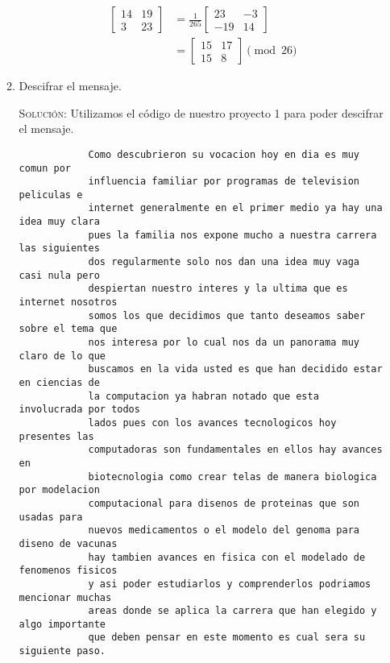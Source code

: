 \documentclass[letterpaper,10pt]{article}
\begin{document}
\begin{enumerate}
\begin{enumerate}
        \begin{align*}
            \begin{bmatrix} 14 & 19 \\ 3 & 23\end{bmatrix} 
            &= \frac{1}{265} \begin{bmatrix} 23 & -3 \\ -19 & 14\end{bmatrix} \\
            &= \begin{bmatrix} 15 & 17 \\ 15 & 8 \end{bmatrix} \pmod{26}
        \end{align*}
        
        \item Descifrar el mensaje.
        
        \textsc{Solución:} Utilizamos el código de nuestro proyecto 1 para
        poder descifrar el mensaje. 
        \begin{verbatim}
            Como descubrieron su vocacion hoy en dia es muy comun por
            influencia familiar por programas de television peliculas e 
            internet generalmente en el primer medio ya hay una idea muy clara 
            pues la familia nos expone mucho a nuestra carrera las siguientes 
            dos regularmente solo nos dan una idea muy vaga casi nula pero 
            despiertan nuestro interes y la ultima que es internet nosotros  
            somos los que decidimos que tanto deseamos saber sobre el tema que 
            nos interesa por lo cual nos da un panorama muy claro de lo que 
            buscamos en la vida usted es que han decidido estar en ciencias de 
            la computacion ya habran notado que esta involucrada por todos 
            lados pues con los avances tecnologicos hoy presentes las     
            computadoras son fundamentales en ellos hay avances en 
            biotecnologia como crear telas de manera biologica por modelacion 
            computacional para disenos de proteinas que son usadas para 
            nuevos medicamentos o el modelo del genoma para diseno de vacunas 
            hay tambien avances en fisica con el modelado de fenomenos fisicos 
            y asi poder estudiarlos y comprenderlos podriamos mencionar muchas 
            areas donde se aplica la carrera que han elegido y algo importante 
            que deben pensar en este momento es cual sera su siguiente paso.
        \end{verbatim}
    \end{enumerate}

\end{enumerate}
\end{document}

